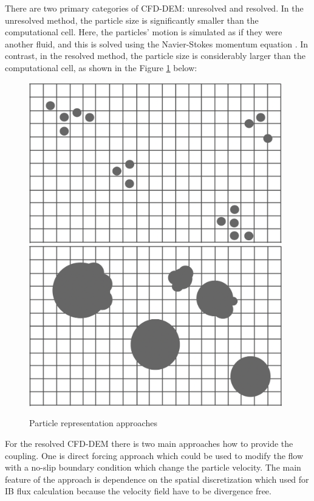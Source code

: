 There are two primary categories of CFD-DEM: unresolved and resolved. In the unresolved method, the particle size is significantly smaller than the computational cell. Here, the particles' motion is simulated as if they were another fluid, and this is solved using the Navier-Stokes momentum equation \cite{kloss2012models}. In contrast, in the resolved method, the particle size is considerably larger than the computational cell, as shown in the Figure \ref{fig:res_unres} below:
\begin{figure}[h]
    \centering
    \includegraphics[width=11cm]{Images/resolved_cfddem.png}
    \includegraphics[width=11cm]{Images/unresolved_cfddem.png}
    \caption{Particle representation approaches}
    \label{fig:res_unres}
\end{figure}
For the resolved CFD-DEM there is two main approaches how to provide the coupling. One is direct forcing approach \cite{uhlmann2005immersed} which could be used to modify the flow with a no-slip boundary condition which change the particle velocity. The main feature of the approach is dependence on the spatial discretization which used for IB flux calculation because the velocity field have to be divergence free.

